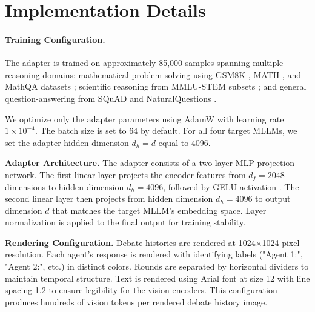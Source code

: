 \documentclass{article}
\theoremstyle{plain}
\theoremstyle{definition}
\theoremstyle{remark}
\begin{document}





\section{Implementation Details}
\label{sect:implementation}

\paragraph{Training Configuration.}
The adapter is trained on approximately 85,000 samples spanning multiple reasoning domains: 
mathematical problem-solving using GSM8K \cite{cobbe2021training}, MATH \cite{hendrycks2021measuring}, 
and MathQA datasets \cite{amini2019mathqa}; scientific reasoning from MMLU-STEM subsets 
\cite{hendrycks2020measuring}; and general 
question-answering from SQuAD \cite{rajpurkar2016squad} and NaturalQuestions \cite{kwiatkowski2019natural}. 



We optimize only the adapter parameters using AdamW \cite{loshchilov2017decoupled} with 
learning rate $1 \times 10^{-4}$. The batch size 
is set to 64 by default.  For all four target MLLMs, we set the adapter hidden dimension 
$d_h = d$ equal to 4096.

\textbf{Adapter Architecture.}
The adapter consists of a two-layer MLP projection network. The first linear layer projects 
the  encoder features from $d_f = 2048$ dimensions to hidden dimension $d_h = 4096$, 
followed by GELU activation \cite{hendrycks2016gaussian}. The second linear layer then projects 
from hidden dimension $d_h = 4096$ to output dimension $d$ that matches the target MLLM's 
embedding space. Layer normalization is applied to the final output for training stability. 

\textbf{Rendering Configuration.}
Debate histories are rendered at 1024×1024 pixel resolution. Each agent's response is 
rendered with identifying labels ("Agent 1:", "Agent 2:", etc.) in distinct colors. 
Rounds are separated by horizontal dividers to maintain temporal structure. Text is 
rendered using Arial font at size 12 with line spacing 1.2 to ensure legibility for 
the vision encoders. This configuration produces hundreds of vision tokens per 
rendered debate history image.
\end{document}
